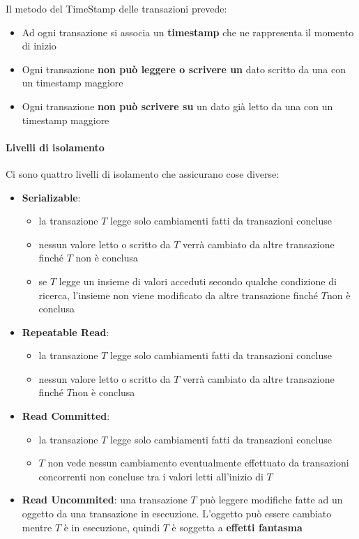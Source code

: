 Il metodo del TimeStamp delle transazioni prevede:
\begin{itemize}
	\item Ad ogni transazione si associa un \textbf{timestamp} che ne rappresenta il momento di inizio
	\item Ogni transazione \textbf{non può leggere o scrivere un} dato scritto da una con un timestamp maggiore
	\item Ogni transazione \textbf{non può scrivere su} un dato già letto da una con un timestamp maggiore
\end{itemize}

\paragraph{Livelli di isolamento}
Ci sono quattro livelli di isolamento che assicurano cose diverse:
\begin{itemize}
	\item \textbf{Serializable}: 
	\begin{itemize}
		\item la transazione $T$ legge solo cambiamenti fatti da transazioni concluse
		\item nessun valore letto o scritto da $T$ verrà cambiato da altre transazione finché $T$ non è conclusa
		\item se $T$ legge un insieme di valori acceduti secondo qualche condizione di ricerca, l'insieme non viene modificato da altre transazione finché $T$non è conclusa
	\end{itemize}
	\item \textbf{Repeatable Read}:
	\begin{itemize}
		\item la transazione $T$ legge solo cambiamenti fatti da transazioni concluse
		\item nessun valore letto o scritto da $T$ verrà cambiato da altre transazione finché $T$non è conclusa
	\end{itemize}
	\item \textbf{Read Committed}:
	\begin{itemize}
		\item la transazione $T$ legge solo cambiamenti fatti da transazioni concluse
		\item $T$ non vede nessun cambiamento eventualmente effettuato da transazioni concorrenti non concluse tra i valori letti all'inizio di $T$
	\end{itemize}
	\item \textbf{Read Uncommited}: una transazione $T$ può leggere modifiche fatte ad un oggetto da una transazione in esecuzione. L'oggetto può essere cambiato mentre $T$ è in esecuzione, quindi $T$ è soggetta a \textbf{effetti fantasma}
\end{itemize}